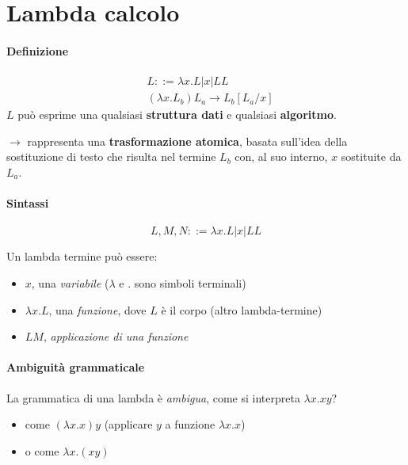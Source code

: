 \chapter{Lambda calcolo}

\subsubsection{Definizione}

\begin{mdframed}[topline=false,bottomline=false,rightline=false]
\begin{align*}
&L ::= \lambda x.L | x | LL\\
&(\lambda x.L_b)L_a \rightarrow L_b[L_a/x]
\end{align*}
$L$ può esprime una qualsiasi \textbf{struttura dati} e qualsiasi \textbf{algoritmo}.

\noindent
$\rightarrow$ rappresenta una \textbf{trasformazione atomica}, basata sull'idea della sostituzione di testo che risulta nel termine $L_b$ con, al suo interno, $x$ sostituite da $L_a$.
\end{mdframed}

\subsubsection{Sintassi}
\begin{equation*}
L,M,N ::= \lambda x.L | x | LL
\end{equation*}

Un lambda termine può essere:
\begin{itemize}
    \item $x$, una \textit{variabile} ($\lambda$ e $.$ sono simboli terminali)
    \item $\lambda x.L$, una \textit{funzione}, dove $L$ è il corpo (altro lambda-termine)
    \item $LM$, \textit{applicazione di una funzione}
\end{itemize}

\subsubsection{Ambiguità grammaticale}
La grammatica di una lambda è \textit{ambigua}, come si interpreta $\lambda x.xy$?
\begin{itemize}
    \item come $(\lambda x.x)y$ (applicare $y$ a funzione $\lambda x.x$)
    \item o come $\lambda x.(xy)$
\end{itemize}

